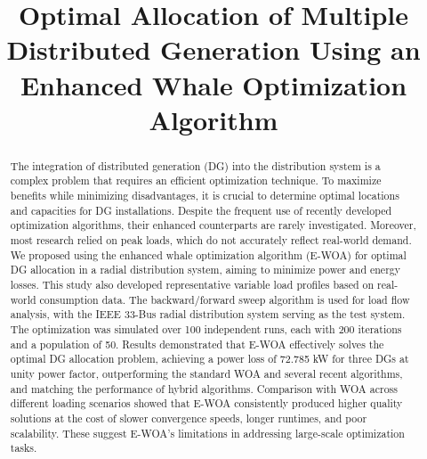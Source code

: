 \documentclass[conference]{IEEEtran}
\begin{document}
\title{Optimal Allocation of Multiple Distributed Generation Using an Enhanced Whale Optimization Algorithm\\
}

\author{
\and
{}
}
\maketitle

\begin{abstract}
The integration of distributed generation (DG) into the distribution system is a complex problem that requires an efficient optimization technique. To maximize benefits while minimizing disadvantages, it is crucial to determine optimal locations and capacities for DG installations. Despite the frequent use of recently developed optimization algorithms, their enhanced counterparts are rarely investigated. Moreover, most research relied on peak loads, which do not accurately reflect real-world demand. We proposed using the enhanced whale optimization algorithm (E-WOA) for optimal DG allocation in a radial distribution system, aiming to minimize power and energy losses. This study also developed representative variable load profiles based on real-world consumption data. The backward/forward sweep algorithm is used for load flow analysis, with the IEEE 33-Bus radial distribution system serving as the test system. The optimization was simulated over 100 independent runs, each with 200 iterations and a population of 50. Results demonstrated that E-WOA effectively solves the optimal DG allocation problem, achieving a power loss of 72.785 kW for three DGs at unity power factor, outperforming the standard WOA and several recent algorithms, and matching the performance of hybrid algorithms. Comparison with WOA across different loading scenarios showed that E-WOA consistently produced higher quality solutions at the cost of slower convergence speeds, longer runtimes, and poor scalability. These suggest E-WOA's limitations in addressing large-scale optimization tasks.
\end{abstract}
\end{document}
